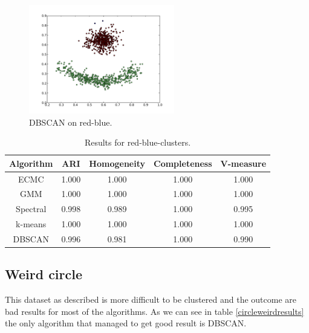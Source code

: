 \documentclass[conference]{IEEEtran}
\begin{document}
\begin{figure}[th]
\centering
\includegraphics[width=15pc]{dbscan_red-blue-clusters.pdf}
\caption{DBSCAN on red-blue.}
\label{DBSCAN_redblue}
\end{figure}

\begin{table}[htbp]
\caption{Results for red-blue-clusters.}
\label{redblueresults}
\begin{center}
\setlength{\tabcolsep}{3pt}
\begin{tabular}{ |c|c|c|c|c| }
\hline
	Algorithm & ARI & Homogeneity & Completeness & V-measure\\ \hline
	
	ECMC & 1.000 & 1.000 & 1.000 & 1.000 \\ \hline
	GMM & 1.000 & 1.000 & 1.000 & 1.000 \\ \hline
	Spectral & 0.998 & 0.989 & 1.000 & 0.995 \\ \hline
	k-means & 1.000 & 1.000 & 1.000 & 1.000 \\ \hline
	DBSCAN & 0.996 & 0.981 & 1.000 & 0.990 \\ \hline
\end{tabular}
\end{center}
\end{table}


\subsection{Weird circle}
This dataset as described is more difficult to be clustered and the outcome are bad results for most of
the algorithms. As we can see in table \ref{circleweirdresults} the only algorithm that managed
to get good result is DBSCAN.
\end{document}
